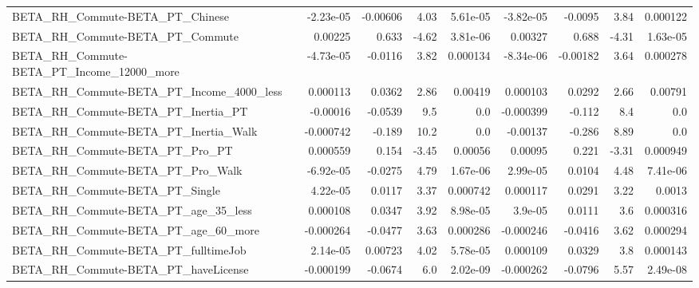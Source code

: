 \begin{tabular}{lrrrrrrrr}
BETA\_RH\_Commute-BETA\_PT\_Chinese                    &   -2.23e-05 &     -0.00606 &     4.03 & 5.61e-05 &  -3.82e-05 &     -0.0095 &         3.84 &      0.000122 \\
BETA\_RH\_Commute-BETA\_PT\_Commute                    &     0.00225 &        0.633 &    -4.62 & 3.81e-06 &    0.00327 &       0.688 &        -4.31 &      1.63e-05 \\
BETA\_RH\_Commute-BETA\_PT\_Income\_12000\_more          &   -4.73e-05 &      -0.0116 &     3.82 & 0.000134 &  -8.34e-06 &    -0.00182 &         3.64 &      0.000278 \\
BETA\_RH\_Commute-BETA\_PT\_Income\_4000\_less           &    0.000113 &       0.0362 &     2.86 &  0.00419 &   0.000103 &      0.0292 &         2.66 &       0.00791 \\
BETA\_RH\_Commute-BETA\_PT\_Inertia\_PT                 &    -0.00016 &      -0.0539 &      9.5 &      0.0 &  -0.000399 &      -0.112 &          8.4 &           0.0 \\
BETA\_RH\_Commute-BETA\_PT\_Inertia\_Walk               &   -0.000742 &       -0.189 &     10.2 &      0.0 &   -0.00137 &      -0.286 &         8.89 &           0.0 \\
BETA\_RH\_Commute-BETA\_PT\_Pro\_PT                     &    0.000559 &        0.154 &    -3.45 &  0.00056 &    0.00095 &       0.221 &        -3.31 &      0.000949 \\
BETA\_RH\_Commute-BETA\_PT\_Pro\_Walk                   &   -6.92e-05 &      -0.0275 &     4.79 & 1.67e-06 &   2.99e-05 &      0.0104 &         4.48 &      7.41e-06 \\
BETA\_RH\_Commute-BETA\_PT\_Single                     &    4.22e-05 &       0.0117 &     3.37 & 0.000742 &   0.000117 &      0.0291 &         3.22 &        0.0013 \\
BETA\_RH\_Commute-BETA\_PT\_age\_35\_less                &    0.000108 &       0.0347 &     3.92 & 8.98e-05 &    3.9e-05 &      0.0111 &          3.6 &      0.000316 \\
BETA\_RH\_Commute-BETA\_PT\_age\_60\_more                &   -0.000264 &      -0.0477 &     3.63 & 0.000286 &  -0.000246 &     -0.0416 &         3.62 &      0.000294 \\
BETA\_RH\_Commute-BETA\_PT\_fulltimeJob                &    2.14e-05 &      0.00723 &     4.02 & 5.78e-05 &   0.000109 &      0.0329 &          3.8 &      0.000143 \\
BETA\_RH\_Commute-BETA\_PT\_haveLicense                &   -0.000199 &      -0.0674 &      6.0 & 2.02e-09 &  -0.000262 &     -0.0796 &         5.57 &      2.49e-08 \\

\end{tabular}
